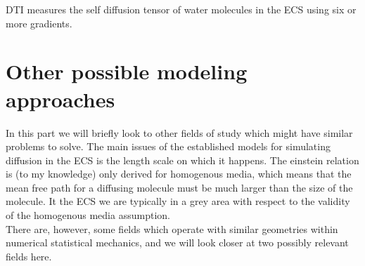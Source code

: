 \documentclass[a4paper,english, 12pt, twoside]{article}
\begin{document}
DTI measures the self diffusion tensor of water molecules in the ECS using six or more gradients. 

\section{Other possible modeling approaches}
In this part we will briefly look to other fields of study which might have similar problems to solve. 
The main issues of the established models for simulating diffusion in the ECS is the length scale on which it happens. 
The einstein relation is (to my knowledge) only derived for homogenous media, which means that the mean free path for a diffusing molecule must be much larger than the size of the molecule. 
It the ECS we are typically in a grey area with respect to the validity of the homogenous media assumption. \\
There are, however, some fields which operate with similar geometries within numerical statistical mechanics, and we will look closer at two possibly relevant fields here.
\end{document}
